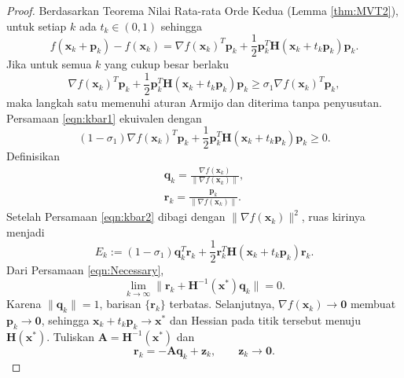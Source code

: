 \begin{proof} Berdasarkan Teorema Nilai Rata-rata Orde Kedua (Lemma \ref{thm:MVT2}), untuk setiap $k$ ada $t_k\in(0,1)$ sehingga
\begin{equation}
f(\mathbf{x}_k+\mathbf{p}_k)-f(\mathbf{x}_k)
=\nabla f(\mathbf{x}_k)^T\mathbf{p}_k
+\frac12\mathbf{p}_k^T\mathbf{H}(\mathbf{x}_k+t_k\mathbf{p}_k)\mathbf{p}_k.
\end{equation}
Jika untuk semua $k$ yang cukup besar berlaku
\begin{equation}
\nabla f(\mathbf{x}_k)^T\mathbf{p}_k
+\frac12\mathbf{p}_k^T\mathbf{H}(\mathbf{x}_k+t_k\mathbf{p}_k)\mathbf{p}_k
\geq\sigma_1\nabla f(\mathbf{x}_k)^T\mathbf{p}_k,
\label{eqn:kbar1}
\end{equation}
maka langkah satu memenuhi aturan Armijo dan diterima tanpa penyusutan. Persamaan \ref{eqn:kbar1} ekuivalen dengan
\begin{equation}
(1-\sigma_1)\nabla f(\mathbf{x}_k)^T\mathbf{p}_k
+\frac12\mathbf{p}_k^T\mathbf{H}(\mathbf{x}_k+t_k\mathbf{p}_k)\mathbf{p}_k
\geq0.
\label{eqn:kbar2}
\end{equation}
Definisikan
\begin{gather*}
\mathbf{q}_k=\frac{\nabla f(\mathbf{x}_k)}{\lVert\nabla f(\mathbf{x}_k)\rVert},\\
\mathbf{r}_k=\frac{\mathbf{p}_k}{\lVert\nabla f(\mathbf{x}_k)\rVert}.
\end{gather*}
Setelah Persamaan \ref{eqn:kbar2} dibagi dengan $\lVert\nabla f(\mathbf{x}_k)\rVert^2$, ruas kirinya menjadi
\begin{equation}
E_k:=(1-\sigma_1)\mathbf{q}_k^T\mathbf{r}_k
+\frac12\mathbf{r}_k^T\mathbf{H}(\mathbf{x}_k+t_k\mathbf{p}_k)\mathbf{r}_k.
\label{eqn:kbar3}
\end{equation}
Dari Persamaan \ref{eqn:Necessary},
\begin{equation}
\lim_{k\to\infty}
\lVert\mathbf{r}_k+\mathbf{H}^{-1}(\mathbf{x}^*)\mathbf{q}_k\rVert=0.
\end{equation}
Karena $\lVert\mathbf{q}_k\rVert=1$, barisan $\{\mathbf{r}_k\}$ terbatas. Selanjutnya, $\nabla f(\mathbf{x}_k)\to\mathbf{0}$ membuat $\mathbf{p}_k\to\mathbf{0}$, sehingga $\mathbf{x}_k+t_k\mathbf{p}_k\to\mathbf{x}^*$ dan Hessian pada titik tersebut menuju $\mathbf{H}(\mathbf{x}^*)$. Tuliskan $\mathbf{A}=\mathbf{H}^{-1}(\mathbf{x}^*)$ dan
\begin{equation}
\mathbf{r}_k=-\mathbf{A}\mathbf{q}_k+\mathbf{z}_k,
\qquad \mathbf{z}_k\to\mathbf{0}.
\end{equation}

\end{proof}
